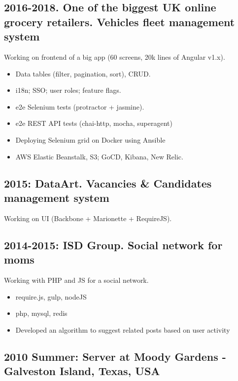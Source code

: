 \documentclass[a4paper, 14pt]{article}
\begin{document}
  \subsection{2016-2018. One of the biggest UK online grocery retailers. Vehicles fleet management system}
    Working on frontend of a big app (60 screens, 20k lines of Angular v1.x).
    \begin{itemize}
      \item Data tables (filter, pagination, sort), CRUD. \\
      \item i18n; SSO; user roles; feature flags. \\
      \item e2e Selenium tests (protractor + jasmine). \\
      \item e2e REST API tests (chai-http, mocha, superagent) \\
      \item Deploying Selenium grid on Docker using Ansible \\
      \item AWS Elastic Beanstalk, S3; GoCD, Kibana, New Relic.
    \end{itemize}

  \subsection{2015: DataArt. Vacancies \& Candidates management system}
    Working on UI (Backbone + Marionette + RequireJS).

	\subsection{2014-2015: ISD Group. Social network for moms}
    Working with PHP and JS for a social network.
      \begin{itemize}
        \item require.js, gulp, nodeJS \\
        \item php, mysql, redis \\
        \item Developed an algorithm to suggest related posts based on user activity
      \end{itemize}

  \subsection{2010 Summer: Server at Moody Gardens - Galveston Island, Texas, USA}
\end{document}
